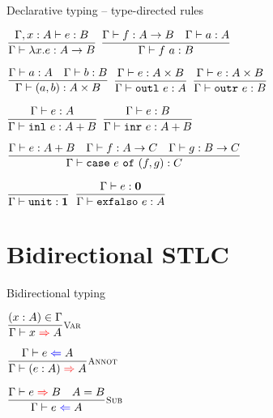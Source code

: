 \documentclass{beamer}
\newcommand{\Fun}[2]{#1 \to #2}
\newcommand{\Prod}[2]{#1 \times #2}
\newcommand{\Sum}[2]{#1 + #2}
\newcommand{\Unit}{\textbf{1}}
\newcommand{\Empty}{\textbf{0}}
\newcommand{\annot}[2]{(#1 : #2)}
\newcommand{\fun}[2]{\lambda #1. #2}
\newcommand{\app}[2]{#1\ #2}
\newcommand{\pair}[2]{(#1, #2)}
\newcommand{\outl}[1][]{\texttt{outl}\ #1}
\newcommand{\outr}[1][]{\texttt{outr}\ #1}
\newcommand{\inl}[1][]{\texttt{inl}\ #1}
\newcommand{\inr}[1][]{\texttt{inr}\ #1}
\newcommand{\case}[3]{\texttt{case}\ #1\ \texttt{of}\ (#2, #3)}
\newcommand{\unit}{\texttt{unit}}
\newcommand{\elimEmpty}[1][]{\texttt{exfalso}\ #1}
\newcommand{\fulltyping}[3]{#1 \vdash #2 : #3}
\newcommand{\typing}[2]{\fulltyping{\Gamma}{#1}{#2}}
\newcommand{\infrule}[3][]{\displaystyle \frac{#2}{#3} \textsc{\footnotesize{#1}}}
\newcommand{\extend}[3]{#1, #2 : #3}
\newcommand{\sidecond}[1]{#1}
\begin{document}
\begin{frame}{Declarative typing -- type-directed rules}

\begin{center}
  $\infrule{\fulltyping{\extend{\Gamma}{x}{A}}{e}{B}}{\typing{\fun{x}{e}}{\Fun{A}{B}}}$ \quad
  $\infrule{\typing{f}{\Fun{A}{B}} \quad \typing{a}{A}}{\typing{\app{f}{a}}{B}}$

  \vspace{2em}

  $\infrule{\typing{a}{A} \quad \typing{b}{B}}{\typing{\pair{a}{b}}{\Prod{A}{B}}}$ \quad
  $\infrule{\typing{e}{\Prod{A}{B}}}{\typing{\outl[e]}{A}}$ \quad
  $\infrule{\typing{e}{\Prod{A}{B}}}{\typing{\outr[e]}{B}}$

  \vspace{2em}

  $\infrule{\typing{e}{A}}{\typing{\inl[e]}{\Sum{A}{B}}}$ \quad
  $\infrule{\typing{e}{B}}{\typing{\inr[e]}{\Sum{A}{B}}}$

  \vspace{2em}

  $\infrule{\typing{e}{\Sum{A}{B}} \quad \typing{f}{\Fun{A}{C}} \quad \typing{g}{\Fun{B}{C}}}{\typing{\case{e}{f}{g}}{C}}$

  \vspace{2em}

  $\infrule{}{\typing{\unit}{\Unit}}$ \quad
  $\infrule{\typing{e}{\Empty}}{\typing{\elimEmpty[e]}{A}}$
\end{center}

\end{frame}

\section{Bidirectional STLC}

\newcommand{\fullcheck}[3]{#1 \vdash #2 \mathcolor{blue}{\Leftarrow} #3}
\renewcommand{\check}[2]{\fullcheck{\Gamma}{#1}{#2}}

\newcommand{\fullinfer}[3]{#1 \vdash #2 \mathcolor{red}{\Rightarrow} #3}
\newcommand{\infer}[2]{\fullinfer{\Gamma}{#1}{#2}}

\begin{frame}{Bidirectional typing}

\begin{center}
  $\infrule[Var]{\sidecond{(x : A) \in \Gamma}}{\infer{x}{A}}$

  \vspace{2em}

  $\infrule[Annot]{\check{e}{A}}{\infer{\annot{e}{A}}{A}}$

  \vspace{2em}

  $\infrule[Sub]{\infer{e}{B} \quad \sidecond{A = B}}{\check{e}{A}}$
\end{center}

\end{frame}
\end{document}
